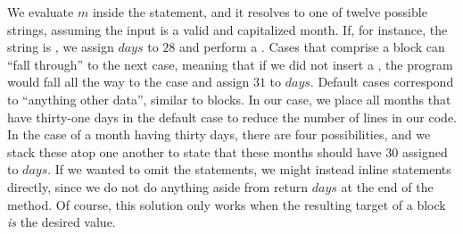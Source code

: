 We evaluate $m$ inside the  statement, and it resolves to one of twelve possible strings, assuming the input is a valid and capitalized month. If, for instance, the string is , we assign $days$ to $28$ and perform a . Cases that comprise a  block can ``fall through'' to the next case, meaning that if we did not insert a , the program would fall all the way to the  case and assign $31$ to $days$. Default cases correspond to ``anything other data'', similar to  blocks. In our case, we place all months that have thirty-one days in the default case to reduce the number of lines in our code. In the case of a month having thirty days, there are four possibilities, and we stack these atop one another to state that these months should have $30$ assigned to $days$. If we wanted to omit the  statements, we might instead inline  statements directly, since we do not do anything aside from return $days$ at the end of the method. Of course, this solution only works when the resulting target of a  block \textit{is} the desired value.